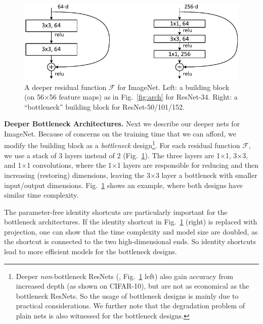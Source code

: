 \documentclass[10pt,twocolumn,letterpaper]{article}
\begin{document}
\begin{figure}[t]
  \begin{center}
    \hspace{12pt}
    \includegraphics[width=0.85\linewidth]{eps/block_deeper}
  \end{center}
  \caption{A deeper residual function $\mathcal{F}$ for ImageNet. Left: a building block (on 56$\times$56 feature maps) as in Fig.~\ref{fig:arch} for ResNet-34. Right: a ``bottleneck'' building block for ResNet-50/101/152.}
  \label{fig:block_deeper}
  \vspace{-.6em}
\end{figure}

\vspace{6pt}
\noindent\textbf{Deeper Bottleneck Architectures.} Next we describe our deeper nets for ImageNet. Because of concerns on the training time that we can afford, we modify the building block as a \emph{bottleneck} design\footnote{Deeper \emph{non}-bottleneck ResNets (\eg, Fig.~\ref{fig:block_deeper} left) also gain accuracy from increased depth (as shown on CIFAR-10), but are not as economical as the bottleneck ResNets. So the usage of bottleneck designs is mainly due to practical considerations. We further note that the degradation problem of plain nets is also witnessed for the bottleneck designs.}.
For each residual function $\mathcal{F}$, we use a stack of 3 layers instead of 2 (Fig.~\ref{fig:block_deeper}). The three layers are 1$\times$1, 3$\times$3, and 1$\times$1 convolutions, where the 1$\times$1 layers are responsible for reducing and then increasing (restoring) dimensions, leaving the 3$\times$3 layer a bottleneck with smaller input/output dimensions.
Fig.~\ref{fig:block_deeper} shows an example, where both designs have similar time complexity.

The parameter-free identity shortcuts are particularly important for the bottleneck architectures. If the identity shortcut in Fig.~\ref{fig:block_deeper} (right) is replaced with projection, one can show that the time complexity and model size are doubled, as the shortcut is connected to the two high-dimensional ends. So identity shortcuts lead to more efficient models for the bottleneck designs.
\end{document}
